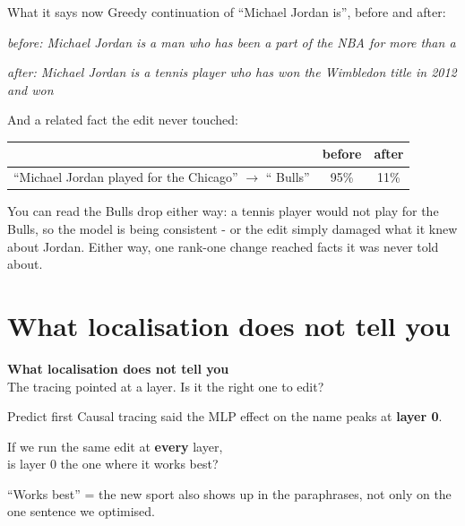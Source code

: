 \documentclass[aspectratio=169]{beamer}
\newcommand{\watchbox}[1]{%
  \begin{tcolorbox}[colback=armorange!12, colframe=armorange, boxrule=0.6pt, arc=2pt]
  #1
  \end{tcolorbox}}
\newcommand{\promptbox}[1]{%
  \begin{center}
  \begin{tcolorbox}[colback=lightbg, colframe=gray, boxrule=0.5pt, arc=2pt, width=0.88\textwidth]
    \centering\textit{#1}
  \end{tcolorbox}
  \end{center}}
\newcommand{\sectiontransition}[2]{%
  \begin{frame}[plain]
    \vfill
    \begin{center}
      {\Huge\bfseries\color{popblue} #1}\\[1.1em]
      {\large #2}
    \end{center}
    \vfill
  \end{frame}}
\begin{document}
\begin{frame}{What it says now}
  \vspace{0.1em}
  Greedy continuation of ``Michael Jordan is'', before and after:
  \promptbox{before: Michael Jordan is a man who has been a part of the NBA for more than a}
  \vspace{-0.6em}
  \promptbox{after: Michael Jordan is a tennis player who has won the Wimbledon title in 2012 and won}

  \vspace{-0.2em}
  And a related fact the edit never touched:
  \begin{center}
  \small
  \begin{tabular}{@{}lcc@{}}
    \toprule
    & before & after\\
    \midrule
    ``Michael Jordan played for the Chicago'' $\rightarrow$ `` Bulls'' & 95\% & 11\%\\
    \bottomrule
  \end{tabular}
  \end{center}

  \vspace{-0.2em}
  \watchbox{\small You can read the Bulls drop either way: a tennis player would not play for the
  Bulls, so the model is being consistent - or the edit simply damaged what it knew about Jordan.
  Either way, one rank-one change reached facts it was never told about.}
\end{frame}

\section{What localisation does not tell you}
\sectiontransition{What localisation does not tell you}{The tracing pointed at a layer. Is it the right one to edit?}

\begin{frame}{Predict first}
  \vspace{1.0em}
  Causal tracing said the MLP effect on the name peaks at \textbf{layer 0}.

  \vspace{1.2em}
  \begin{center}
    {\large If we run the same edit at \textbf{every} layer,\\[0.3em]
    is layer 0 the one where it works best?}
  \end{center}

  \vspace{1.2em}
  \begin{center}
    {\footnotesize ``Works best'' = the new sport also shows up in the paraphrases, not only on the
    one sentence we optimised.}
  \end{center}
\end{frame}
\end{document}
